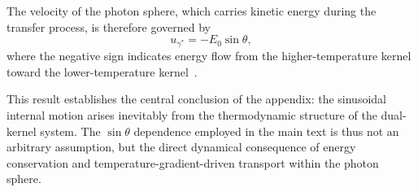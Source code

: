 \documentclass[%
 reprint,
 amsmath,amssymb,
 aps,
 prb,
]{revtex4-2}
\numberwithin{equation}{section}
\begin{document}
The velocity of the photon sphere, which carries kinetic energy during the transfer process, is therefore governed by
\begin{equation}
\boxed{
u_{\gamma^*} = -E_0 \sin\theta,
}
\label{eq:photon_velocity}
\end{equation}
where the negative sign indicates energy flow from the higher-temperature kernel toward the lower-temperature kernel~\cite{hanamura16759284}.

This result establishes the central conclusion of the appendix: the sinusoidal internal motion arises inevitably from the thermodynamic structure of the dual-kernel system. The $\sin\theta$ dependence employed in the main text is thus not an arbitrary assumption, but the direct dynamical consequence of energy conservation and temperature-gradient-driven transport within the photon sphere.






\clearpage
\end{document}
